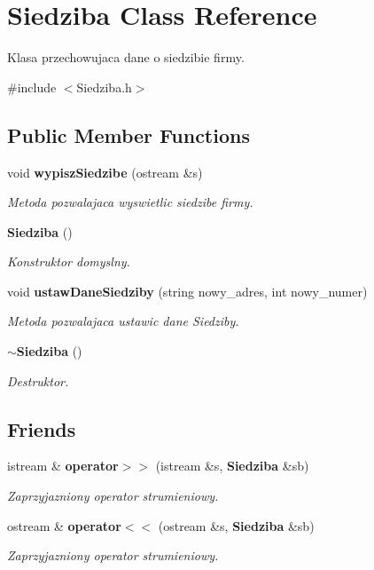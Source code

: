 \section{Siedziba Class Reference}
\label{class_siedziba}


Klasa przechowujaca dane o siedzibie firmy.  




{\ttfamily \#include $<$Siedziba.\+h$>$}

\subsection*{Public Member Functions}
\begin{DoxyCompactItemize}
\item 
void \textbf{ wypisz\+Siedzibe} (ostream \&s)
\begin{DoxyCompactList}\small\item\em Metoda pozwalajaca wyswietlic siedzibe firmy. \end{DoxyCompactList}\item 
\textbf{ Siedziba} ()
\begin{DoxyCompactList}\small\item\em Konstruktor domyslny. \end{DoxyCompactList}\item 
void \textbf{ ustaw\+Dane\+Siedziby} (string nowy\+\_\+adres, int nowy\+\_\+numer)
\begin{DoxyCompactList}\small\item\em Metoda pozwalajaca ustawic dane Siedziby. \end{DoxyCompactList}\item 
\textbf{ $\sim$\+Siedziba} ()
\begin{DoxyCompactList}\small\item\em Destruktor. \end{DoxyCompactList}\end{DoxyCompactItemize}
\subsection*{Friends}
\begin{DoxyCompactItemize}
\item 
istream \& \textbf{ operator$>$$>$} (istream \&s, \textbf{ Siedziba} \&sb)
\begin{DoxyCompactList}\small\item\em Zaprzyjazniony operator strumieniowy. \end{DoxyCompactList}\item 
ostream \& \textbf{ operator$<$$<$} (ostream \&s, \textbf{ Siedziba} \&sb)
\begin{DoxyCompactList}\small\item\em Zaprzyjazniony operator strumieniowy. \end{DoxyCompactList}\end{DoxyCompactItemize}


